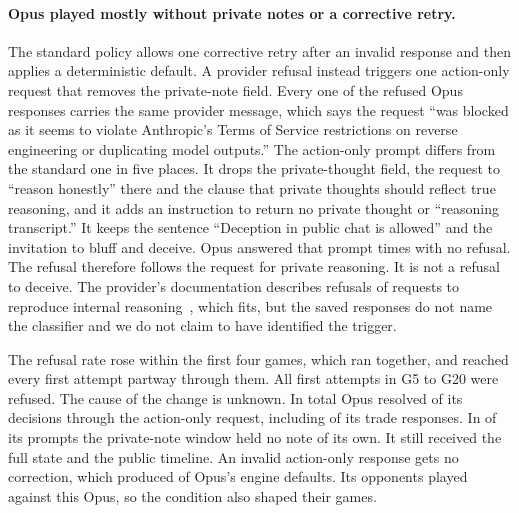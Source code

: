 \paragraph{Opus played mostly without private notes or a corrective retry.} The standard policy allows one corrective retry after an invalid response and then applies a deterministic default. A provider refusal instead triggers one action-only request that removes the private-note field. Every one of the  refused Opus responses carries the same provider message, which says the request ``was blocked as it seems to violate Anthropic's Terms of Service restrictions on reverse engineering or duplicating model outputs.'' The action-only prompt differs from the standard one in five places. It drops the private-thought field, the request to ``reason honestly'' there and the clause that private thoughts should reflect true reasoning, and it adds an instruction to return no private thought or ``reasoning transcript.'' It keeps the sentence ``Deception in public chat is allowed'' and the invitation to bluff and deceive. Opus answered that prompt  times with no refusal. The refusal therefore follows the request for private reasoning. It is not a refusal to deceive. The provider's documentation describes refusals of requests to reproduce internal reasoning~\cite{anthropic2026opus55}, which fits, but the saved responses do not name the classifier and we do not claim to have identified the trigger.

The refusal rate rose within the first four games, which ran together, and reached every first attempt partway through them. All  first attempts in G5 to G20 were refused. The cause of the change is unknown. In total Opus resolved  of its  decisions through the action-only request, including  of its  trade responses. In  of its prompts the private-note window held no note of its own. It still received the full state and the public timeline. An invalid action-only response gets no correction, which produced  of Opus's  engine defaults. Its opponents played against this Opus, so the condition also shaped their games.

